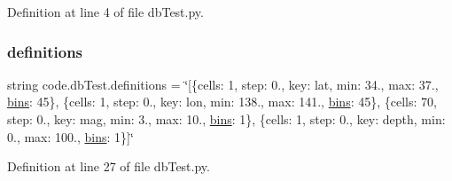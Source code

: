 Definition at line 4 of file db\+Test.\+py.

\mbox{\label{namespacecode_1_1db_test_a18a56fcf49697eac62112214eac2cfc9}} 
\subsubsection{\texorpdfstring{definitions}{definitions}}
{\footnotesize\ttfamily string code.\+db\+Test.\+definitions = \char`\"{}\mbox{[}\{\textquotesingle{}cells\textquotesingle{}\+: 1, \textquotesingle{}step\textquotesingle{}\+: 0., \textquotesingle{}key\textquotesingle{}\+: \textquotesingle{}lat\textquotesingle{}, \textquotesingle{}min\textquotesingle{}\+: 34., \textquotesingle{}max\textquotesingle{}\+: 37., \textquotesingle{}\hyperlink{namespacecode_1_1db_test_a561bd0a04a7558dbcf60255372f36535}{bins}\textquotesingle{}\+: 45\}, \{\textquotesingle{}cells\textquotesingle{}\+: 1, \textquotesingle{}step\textquotesingle{}\+: 0., \textquotesingle{}key\textquotesingle{}\+: \textquotesingle{}lon\textquotesingle{}, \textquotesingle{}min\textquotesingle{}\+: 138., \textquotesingle{}max\textquotesingle{}\+: 141., \textquotesingle{}\hyperlink{namespacecode_1_1db_test_a561bd0a04a7558dbcf60255372f36535}{bins}\textquotesingle{}\+: 45\}, \{\textquotesingle{}cells\textquotesingle{}\+: 70, \textquotesingle{}step\textquotesingle{}\+: 0., \textquotesingle{}key\textquotesingle{}\+: \textquotesingle{}mag\textquotesingle{}, \textquotesingle{}min\textquotesingle{}\+: 3., \textquotesingle{}max\textquotesingle{}\+: 10., \textquotesingle{}\hyperlink{namespacecode_1_1db_test_a561bd0a04a7558dbcf60255372f36535}{bins}\textquotesingle{}\+: 1\}, \{\textquotesingle{}cells\textquotesingle{}\+: 1, \textquotesingle{}step\textquotesingle{}\+: 0., \textquotesingle{}key\textquotesingle{}\+: \textquotesingle{}depth\textquotesingle{}, \textquotesingle{}min\textquotesingle{}\+: 0., \textquotesingle{}max\textquotesingle{}\+: 100., \textquotesingle{}\hyperlink{namespacecode_1_1db_test_a561bd0a04a7558dbcf60255372f36535}{bins}\textquotesingle{}\+: 1\}\mbox{]}\char`\"{}}



Definition at line 27 of file db\+Test.\+py.

\mbox{\label{namespacecode_1_1db_test_a1a684511f172ae02c84e5025bf6c96f5}} 
